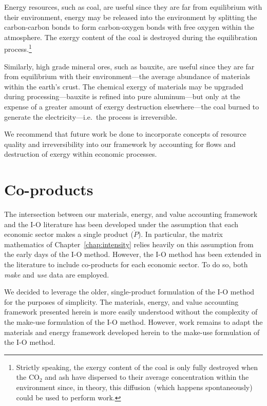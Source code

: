 
Energy resources, such as coal, are useful
since they are far from equilibrium with their environment,
energy may be released into the environment by
splitting the carbon-carbon bonds to form 
carbon-oxygen bonds with free oxygen 
within the atmosphere.
The exergy content of the coal is destroyed during
the equilibration process.\footnote{Strictly speaking,
the exergy content of the coal is only fully destroyed
when the CO$_2$ and ash have dispersed to their average
concentration within the environment since,
in theory,
this diffusion~(which happens spontaneously) 
could be used to perform work.}

Similarly, high grade mineral ores, such as bauxite, 
are useful since they are far from equilibrium with their
environment---the average abundance of materials
within the earth's crust.
The chemical exergy of materials may be upgraded
during processing---bauxite is refined into pure 
aluminum---but only at the expense of a greater
amount of exergy destruction elsewhere---the coal
burned to generate the electricity---i.e.\ the process is irreversible.

We recommend that future work be done to incorporate 
concepts of resource quality and irreversibility 
into our framework by accounting for flows and
destruction of exergy within economic processes.


\section{Co-products}
\label{sec:make-use}

The intersection between our materials, energy, and value accounting framework 
and the I-O literature has been developed under the assumption 
that each economic sector makes a single product ($\dot{P}$).
In particular, the matrix mathematics of Chapter~\ref{chap:intensity}
relies heavily on this assumption 
from the early days of the I-O method.\cite{Bullard:1978vd}
However, the I-O method has been extended 
in the literature to include
co-products for each economic sector.\cite{Costanza:1984tq,Casler1984} 
To do so, both \emph{make} and \emph{use} data are employed.

We decided to leverage the older,
single-product formulation of the I-O method
for the purposes of simplicity. 
The materials, energy, and value accounting framework
presented herein is more easily understood 
without the complexity of the make-use formulation 
of the I-O method.
However, work remains to adapt the materials and energy framework
developed herein to the make-use formulation of the I-O method.


